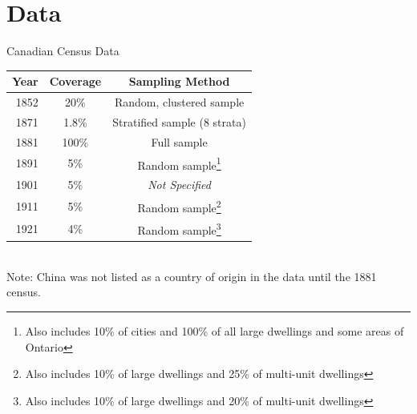 \documentclass[pdf]{beamer}
\begin{document}
\section{Data}
\begin{frame}{Canadian Census Data}
    \centering
    \begin{tabular}{|r||c|c|}
        \hline 
        Year & Coverage & Sampling Method \\
        \hline 
        1852 & 20\% & Random, clustered sample \\
        1871 & 1.8\% & Stratified sample (8 strata)\\
        1881 & 100\% & Full sample \\
        1891 & 5\% & Random sample\footnote{Also includes 10\% of cities and 100\% of all large dwellings and some areas of Ontario} \\
        1901 & 5\% & \textit{Not Specified} \\
        1911 & 5\% & Random sample\footnote{Also includes 10\% of large dwellings and 25\% of multi-unit dwellings} \\
        1921 & 4\% & Random sample\footnote{Also includes 10\% of large dwellings and 20\% of multi-unit dwellings} \\
        \hline
    \end{tabular} \\
    Note: China was not listed as a country of origin in the data until the 1881 census.
\end{frame}

\end{document}
